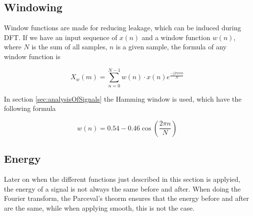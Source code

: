 \subsection{Windowing}
\label{sec:windowing}
Window functions are made for reducing leakage, which can be induced during DFT. If we have an input sequence of $x(n)$ and a window function $w(n)$, where $N$ is the sum of all samples, $n$ is a given sample, the formula of any window function is

\begin{equation}
X_w(m) = \sum_{n=0}^{N-1} w(n)\cdot x(n)e^{\frac{-j2\pi nm}{N}}
\end{equation}

In section \ref{sec:analysisOfSignals} the Hamming window is used, which have the following formula

\begin{equation}
w(n) = 0.54-0.46\cos\left(\frac{2\pi n}{N}\right)
\end{equation}

\subsection{Energy}

Later on when the different functions just described in this section is applyied, the energy of a signal is not always the same before and after. When doing the Fourier transform, the Parceval's theorm ensures that the energy before and after are the same, while when applying smooth, this is not the case. 
